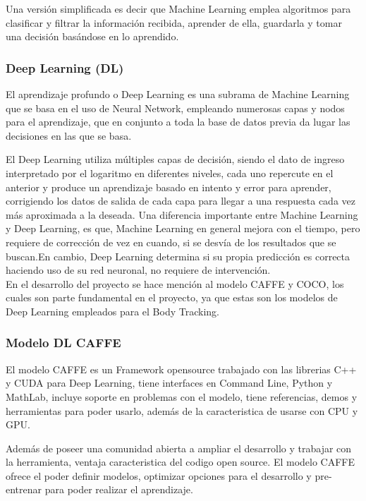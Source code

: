 Una versión simplificada es decir que Machine Learning emplea algoritmos para clasificar y filtrar la información recibida, aprender de ella, guardarla y tomar una decisión basándose en lo aprendido. 

\subsubsection{Deep Learning (DL)}

El aprendizaje profundo o Deep Learning es una subrama de Machine Learning que se basa en el uso de Neural Network, empleando numerosas capas y nodos para el aprendizaje, que en conjunto a toda la base de datos previa da lugar las decisiones en las que se basa.

El Deep Learning utiliza múltiples capas de decisión, siendo el dato de ingreso interpretado por el logaritmo en diferentes niveles, cada uno repercute en el anterior y produce un aprendizaje basado en intento y error para aprender, corrigiendo los datos de salida de cada capa para llegar a una respuesta cada vez más aproximada a la deseada.
Una diferencia importante entre Machine Learning y Deep Learning, es que, Machine Learning en general mejora con el tiempo, pero requiere de corrección de vez en cuando, si se desvía de los resultados que se buscan.En cambio, Deep Learning determina si su propia predicción es correcta haciendo uso de su red neuronal, no requiere de intervención.
\\
En el desarrollo del proyecto se hace mención al modelo CAFFE y COCO, los cuales son parte fundamental en el proyecto, ya que estas son los modelos de Deep Learning empleados para el Body Tracking.

\subsubsection{Modelo DL CAFFE}

El modelo CAFFE es un Framework opensource trabajado con las librerias C++ y CUDA para Deep Learning, tiene interfaces en Command Line, Python y MathLab, incluye soporte en problemas con el modelo, tiene referencias, demos y herramientas para poder usarlo, además de la caracteristica de usarse con CPU y GPU\cite{jia2014caffe}.

Además de poseer una comunidad abierta a ampliar el desarrollo y trabajar con la herramienta, ventaja caracteristica del codigo open source. 
El modelo CAFFE ofrece el poder definir modelos, optimizar opciones para el desarrollo y pre-entrenar para poder realizar el aprendizaje.

